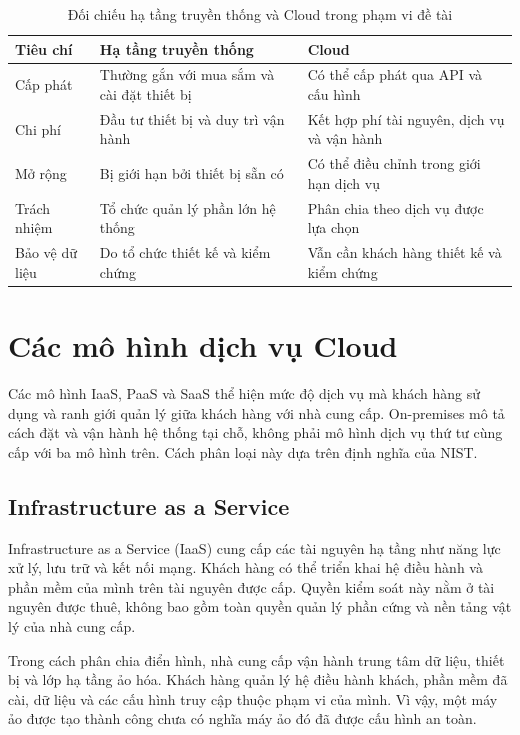 \begin{table}[htbp]
\centering\small
\caption{Đối chiếu hạ tầng truyền thống và Cloud trong phạm vi đề tài}
\begin{tabularx}{\textwidth}{@{}>{\raggedright\arraybackslash}p{2.8cm}XX@{}}
\toprule
\textbf{Tiêu chí} & \textbf{Hạ tầng truyền thống} & \textbf{Cloud} \\
\midrule
Cấp phát & Thường gắn với mua sắm và cài đặt thiết bị & Có thể cấp phát qua API và cấu hình \\
Chi phí & Đầu tư thiết bị và duy trì vận hành & Kết hợp phí tài nguyên, dịch vụ và vận hành \\
Mở rộng & Bị giới hạn bởi thiết bị sẵn có & Có thể điều chỉnh trong giới hạn dịch vụ \\
Trách nhiệm & Tổ chức quản lý phần lớn hệ thống & Phân chia theo dịch vụ được lựa chọn \\
Bảo vệ dữ liệu & Do tổ chức thiết kế và kiểm chứng & Vẫn cần khách hàng thiết kế và kiểm chứng \\
\bottomrule
\end{tabularx}
\end{table}

\section{Các mô hình dịch vụ Cloud}
Các mô hình IaaS, PaaS và SaaS thể hiện mức độ dịch vụ mà khách hàng sử dụng và ranh giới quản lý giữa khách hàng với nhà cung cấp. On-premises mô tả cách đặt và vận hành hệ thống tại chỗ, không phải mô hình dịch vụ thứ tư cùng cấp với ba mô hình trên. Cách phân loại này dựa trên định nghĩa của NIST.\cite{nistcloud}

\subsection{Infrastructure as a Service}
Infrastructure as a Service (IaaS) cung cấp các tài nguyên hạ tầng như năng lực xử lý, lưu trữ và kết nối mạng. Khách hàng có thể triển khai hệ điều hành và phần mềm của mình trên tài nguyên được cấp. Quyền kiểm soát này nằm ở tài nguyên được thuê, không bao gồm toàn quyền quản lý phần cứng và nền tảng vật lý của nhà cung cấp.

Trong cách phân chia điển hình, nhà cung cấp vận hành trung tâm dữ liệu, thiết bị và lớp hạ tầng ảo hóa. Khách hàng quản lý hệ điều hành khách, phần mềm đã cài, dữ liệu và các cấu hình truy cập thuộc phạm vi của mình. Vì vậy, một máy ảo được tạo thành công chưa có nghĩa máy ảo đó đã được cấu hình an toàn.

